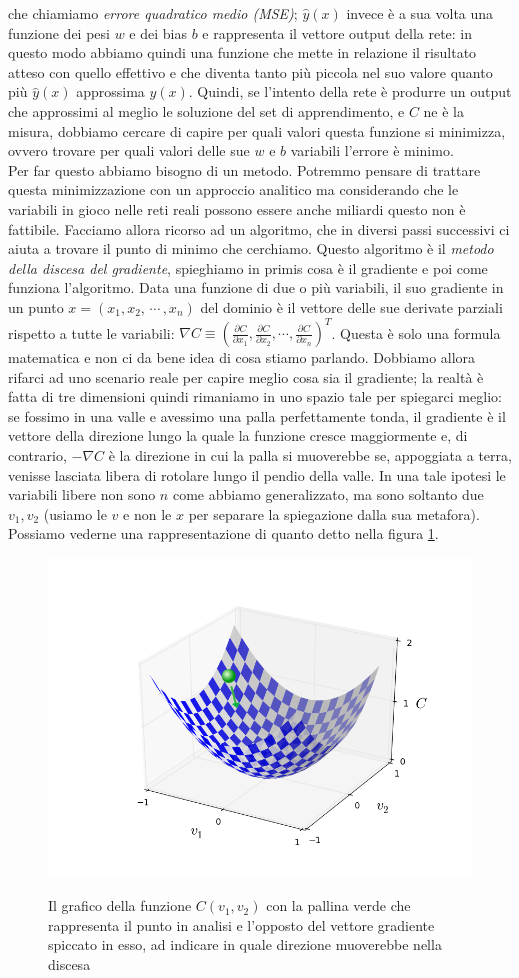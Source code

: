 che chiamiamo \textit{errore quadratico medio (MSE)}; $\hat{y}(x)$ invece è a sua volta una funzione dei pesi $w$ e dei bias $b$ e rappresenta il vettore output della rete: in questo modo abbiamo quindi una funzione che mette in relazione il risultato atteso con quello effettivo e che diventa tanto più piccola nel suo valore quanto più $\hat{y}(x)$ approssima $y(x)$. Quindi, se l'intento della rete è produrre un output che approssimi al meglio le soluzione del set di apprendimento, e $C$ ne è la misura, dobbiamo cercare di capire per quali valori questa funzione si minimizza, ovvero trovare per quali valori delle sue $w$ e $b$ variabili l'errore è minimo. 
\\
Per far questo abbiamo bisogno di un metodo. Potremmo pensare di trattare questa minimizzazione con un approccio analitico ma considerando che le variabili in gioco nelle reti reali possono essere anche miliardi questo non è fattibile. 
Facciamo allora ricorso ad un algoritmo, che in diversi passi successivi ci aiuta a trovare il punto di minimo che cerchiamo. Questo algoritmo è il \textit{metodo della discesa del gradiente}, spieghiamo in primis cosa è il gradiente e poi come funziona l'algoritmo.
Data una funzione di due o più variabili, il suo gradiente in un punto $x=(x_{1}, x_{2},\, \cdots \, , x_{n})$ del dominio è il vettore delle sue derivate parziali rispetto a tutte le variabili: $\nabla C \equiv (\frac{\partial C}{\partial x_{1}}, \frac{\partial C}{\partial x_{2}}, \cdots, \frac{\partial C}{\partial x_{n}})^{T}$. Questa è solo una formula matematica e non ci da bene idea di cosa stiamo parlando. Dobbiamo allora rifarci ad uno scenario reale per capire meglio cosa sia il gradiente; la realtà è fatta di tre dimensioni quindi rimaniamo in uno spazio tale per spiegarci meglio: se fossimo in una valle e avessimo una palla perfettamente tonda, il gradiente è il vettore della direzione lungo la quale la funzione cresce maggiormente e, di contrario, $-\nabla C$ è la direzione in cui la palla si muoverebbe se, appoggiata a terra, venisse lasciata libera di rotolare lungo il pendio della valle. In una tale ipotesi le variabili libere non sono $n$ come abbiamo generalizzato, ma sono soltanto due $v_{1}, v_{2}$ (usiamo le $v$ e non le $x$ per separare la spiegazione dalla sua metafora). Possiamo vederne una rappresentazione di quanto detto nella figura \ref{gradiente}.

\begin{figure}[hbtb]
\centering
{\includegraphics[width=.45\textwidth]{media_tesi/valley_with_ball.png}}
\caption{Il grafico della funzione $C(v_{1}, v_{2})$ con la pallina verde che rappresenta il punto in analisi e l'opposto del vettore gradiente spiccato in esso, ad indicare in quale direzione muoverebbe nella discesa}
\label{gradiente}
\end{figure}

